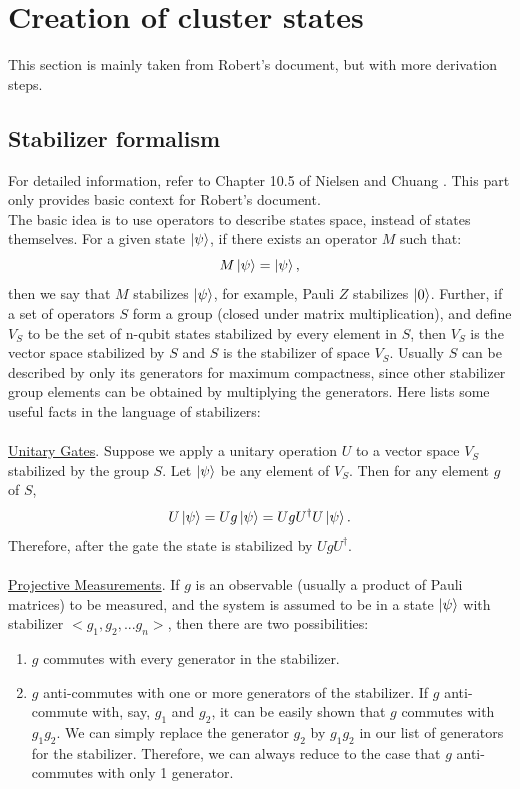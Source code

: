 \documentclass[letterpaper,10pt]{article}
\begin{document}
\section{Creation of cluster states}
\label{sec:create_cluster}
This section is mainly taken from Robert's document, but with more derivation steps. 
\subsection{Stabilizer formalism}
For detailed information, refer to Chapter 10.5 of Nielsen and Chuang \cite{Nielsen2000}. This part only provides basic context for Robert's document.\\
The basic idea is to use operators to describe states space, instead of states themselves. For a given state $\Ket{\psi}$, if there exists an operator $M$ such that:
\begin{equation*}
	M\Ket{\psi} = \Ket{\psi},
\end{equation*} 
then we say that $M$ stabilizes $\Ket{\psi}$, for example, Pauli $Z$ stabilizes $\Ket{0}$. Further, if a set of operators $S$ form a group (closed under matrix multiplication), and define $V_S$ to be the set of n-qubit states stabilized by every element in $S$, then $V_S$ is the vector space stabilized by $S$ and $S$ is the stabilizer of space $V_S$. Usually $S$ can be described by only its generators for maximum compactness, since other stabilizer group elements can be obtained by multiplying the generators.
Here lists some useful facts in the language of stabilizers:\\ \\
\underline{Unitary Gates}. Suppose we apply a unitary operation $U$ to a vector space $V_S$ stabilized by the group $S$. Let $\Ket{\psi}$ be any element of $V_S$. Then for any element $g$ of $S$,
\begin{equation}
	U\Ket{\psi}=Ug\Ket{\psi}=UgU^{\dag}U\Ket{\psi}.
\end{equation}
Therefore, after the gate the state is stabilized by $UgU^{\dag}$.\\ \\
\underline{Projective Measurements}. If $g$ is an observable (usually a product of Pauli matrices) to be measured, and the system is assumed to be in a state $\Ket{\psi}$ with stabilizer $<g_1,g_2,...g_n>$, then there are two possibilities:
\begin{enumerate}
	\item
	$g$ commutes with every generator in the stabilizer.
	\item
	$g$ anti-commutes with one or more generators of the stabilizer. If $g$ anti-commute with, say, $g_1$ and $g_2$, it can be easily shown that $g$ commutes with $g_1g_2$. We can simply replace the generator $g_2$ by $g_1g_2$ in our list of generators for the stabilizer. Therefore, we can always reduce to the case that $g$ anti-commutes with only 1 generator.

\end{enumerate}
\end{document}
